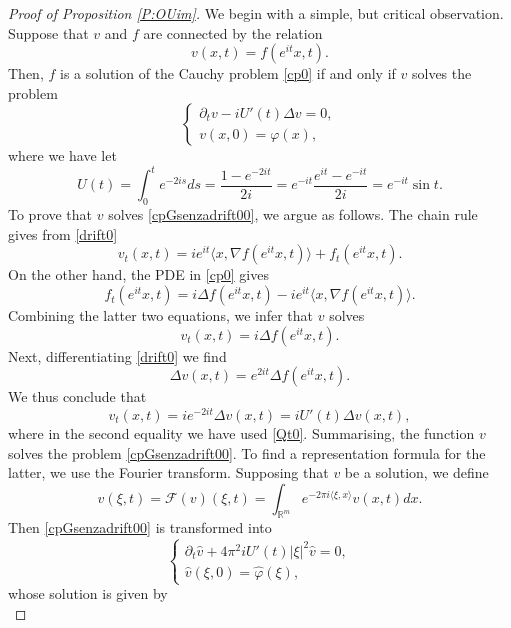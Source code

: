\documentclass[11pt,a4paper]{amsart}
\def \vf{\varphi}
\newcommand{\Rm}{\mathbb R^m}
\newcommand{\p}{\partial}
\numberwithin{equation}{section}
\newcommand{\sa}{\langle}
\newcommand{\da}{\rangle}
\numberwithin{equation}{section}
\begin{document}
\begin{proof}[Proof of Proposition \ref{P:OUim}]

We begin with a simple, but critical observation. Suppose that $v$ and $f$ are connected by the relation
\begin{equation}\label{drift0}
v(x,t) = f(e^{i t} x,t).
\end{equation}
Then, $f$ is a solution of the Cauchy problem \eqref{cp0} if and only if $v$ solves the problem
\begin{equation}\label{cpGsenzadrift00}
\begin{cases}
\p_t v - i U'(t) \Delta v = 0,
\\
v(x,0) = \vf(x),
\end{cases}
\end{equation} 
where we have let
\begin{equation}\label{Qt0}
U(t) =  \int_0^t e^{-2is} ds = \frac{1-e^{-2it}}{2i} = e^{-it} \frac{e^{it}-e^{-it}}{2i} = e^{-it} \sin t.
\end{equation}
To prove that $v$ solves \eqref{cpGsenzadrift00}, we argue as follows. The chain rule gives from \eqref{drift0}
\[
v_t(x,t) = i e^{it} \sa x,\nabla f(e^{it} x,t)\da + f_t(e^{it} x,t).
\]
On the other hand, the PDE in \eqref{cp0} gives
\[
f_t(e^{it} x,t) = i \Delta f(e^{it} x,t) - i e^{it} \sa x,\nabla f(e^{it} x,t)\da.
\]
Combining the latter two equations, we infer that $v$ solves 
\[
v_t(x,t) = i \Delta f(e^{it} x,t).
\]
Next, differentiating \eqref{drift0} we find
\[
\Delta v(x,t) = e^{2it} \Delta f(e^{it} x,t).
\]
We thus conclude that 
\[
v_t(x,t) = i e^{-2it} \Delta v(x,t) = i U'(t) \Delta v(x,t),
\]
where in the second equality we have used \eqref{Qt0}.
Summarising, the function $v$ solves the problem \eqref{cpGsenzadrift00}.
To find a representation formula for the latter, we use the Fourier transform.
Supposing that $v$ be a solution, we define
\begin{equation}\label{pFTv}
\hat v(\xi,t) = \mathscr F(v)(\xi,t) = \int_{\Rm} e^{-2\pi i\sa \xi,x\da} v(x,t) dx.
\end{equation}
Then \eqref{cpGsenzadrift00} is transformed into
\begin{equation}\label{cpGsenzadrift0}
\begin{cases}
\p_t \hat v + 4\pi^2 i U'(t)|\xi|^2 \hat v = 0,
\\
\hat v(\xi,0) = \hat \vf(\xi),
\end{cases}
\end{equation} 
whose solution is given by
\begin{equation}\label{hatv}

\end{equation}
\end{proof}
\end{document}
